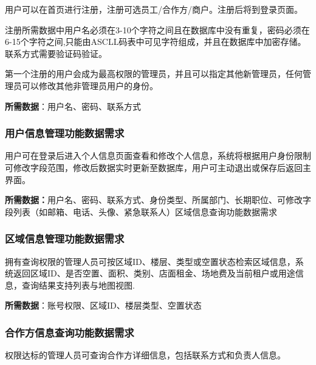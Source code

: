 \documentclass[]{article}
\begin{document}
用户可以在首页进行注册，注册可选员工/合作方/商户。注册后将到登录页面。

注册所需数据中用户名必须在3-10个字符之间且在数据库中没有重复，密码必须在6-15个字符之间,只能由ASCLL码表中可见字符组成，并且在数据库中加密存储。联系方式需要验证码验证。

第一个注册的用户会成为最高权限的管理员，并且可以指定其他新管理员，任何管理员可以修改其他非管理员用户的身份。

\textbf{所需数据}：用户名、密码、联系方式

\hypertarget{ux7528ux6237ux4fe1ux606fux7ba1ux7406ux529fux80fdux6570ux636eux9700ux6c42}{%
  \subsubsection{用户信息管理功能数据需求}\label{ux7528ux6237ux4fe1ux606fux7ba1ux7406ux529fux80fdux6570ux636eux9700ux6c42}}

用户可在登录后进入个人信息页面查看和修改个人信息，系统将根据用户身份限制可修改字段范围，修改后数据实时更新至数据库，用户可主动退出或保存后返回主界面。

\textbf{所需数据：}用户名、密码、联系方式、身份类型、所属部门、长期职位、可修改字段列表（如邮箱、电话、头像、紧急联系人）区域信息查询功能数据需求

\hypertarget{ux533aux57dfux4fe1ux606fux7ba1ux7406ux529fux80fdux6570ux636eux9700ux6c42}{%
  \subsubsection{区域信息管理功能数据需求}\label{ux533aux57dfux4fe1ux606fux7ba1ux7406ux529fux80fdux6570ux636eux9700ux6c42}}

拥有查询权限的管理人员可按区域ID、楼层、类型或空置状态检索区域信息，系统返回区域ID、是否空置、面积、类别、店面租金、场地费及当前租户或用途信息，查询结果支持列表与地图视图.

\textbf{所需数据}：账号权限、区域ID、楼层类型、空置状态

\hypertarget{ux5408ux4f5cux65b9ux4fe1ux606fux67e5ux8be2ux529fux80fdux6570ux636eux9700ux6c42}{%
  \subsubsection{合作方信息查询功能数据需求}\label{ux5408ux4f5cux65b9ux4fe1ux606fux67e5ux8be2ux529fux80fdux6570ux636eux9700ux6c42}}

权限达标的管理人员可查询合作方详细信息，包括联系方式和负责人信息。
\end{document}
